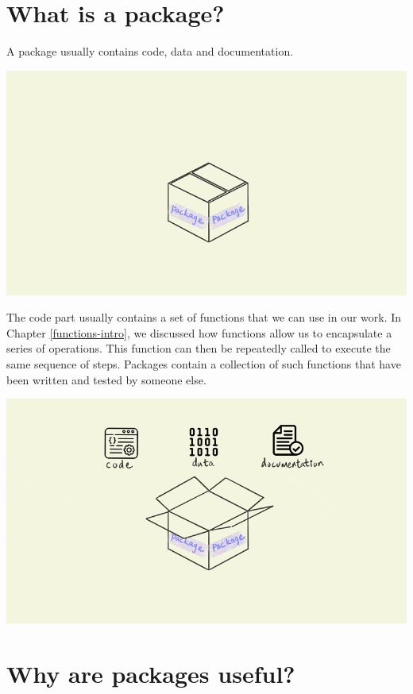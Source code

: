 \documentclass[
]{book}
\begin{document}
\hypertarget{what-is-a-package}{%
\section{What is a package?}\label{what-is-a-package}}

A package usually contains code, data and documentation.

\includegraphics{assets/packages/gifs/package_open.gif}

The code part usually contains a set of functions that we can use in our work. In Chapter \ref{functions-intro}, we discussed how functions allow us to encapsulate a series of operations. This function can then be repeatedly called to execute the same sequence of steps. Packages contain a collection of such functions that have been written and tested by someone else.

\includegraphics{assets/packages/gifs/package_fn.gif}

\hypertarget{why-are-packages-useful}{%
\section{Why are packages useful?}\label{why-are-packages-useful}}
\end{document}
